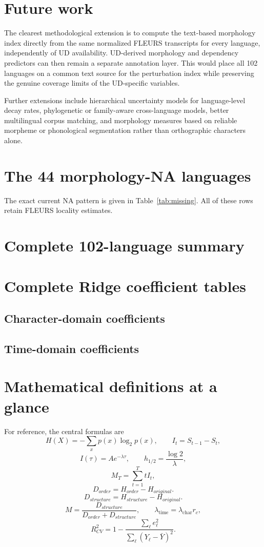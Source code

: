 \documentclass[11pt]{article}
\newcommand{\lch}{\lambda_{\mathrm{char}}}
\newcommand{\ltm}{\lambda_{\mathrm{time}}}
\begin{document}
\section{Future work}
The clearest methodological extension is to compute the text-based morphology index directly from the same normalized FLEURS transcripts for every language, independently of UD availability. UD-derived morphology and dependency predictors can then remain a separate annotation layer. This would place all 102 languages on a common text source for the perturbation index while preserving the genuine coverage limits of the UD-specific variables.

Further extensions include hierarchical uncertainty models for language-level decay rates, phylogenetic or family-aware cross-language models, better multilingual corpus matching, and morphology measures based on reliable morpheme or phonological segmentation rather than orthographic characters alone.

\appendix
\section{The 44 morphology-NA languages}
The exact current NA pattern is given in Table~\ref{tab:missing}. All of these rows retain FLEURS locality estimates.

\section{Complete 102-language summary}
\label{app:lang}
\small

\normalsize

\section{Complete Ridge coefficient tables}
\label{app:coeff}
\small
\subsection*{Character-domain coefficients}

\subsection*{Time-domain coefficients}

\normalsize

\section{Mathematical definitions at a glance}
For reference, the central formulas are
\[
H(X)=-\sum_xp(x)\log_2p(x),
\qquad
I_t=S_{t-1}-S_t,
\]
\[
I(\tau)=Ae^{-\lambda \tau},
\qquad
h_{1/2}=\frac{\log 2}{\lambda},
\]
\[
M_T=\sum_{t=1}^{T}tI_t,
\]
\[
D_{order}=H_{order}-H_{original}.
\]
\[
D_{structure}=H_{structure}-H_{original}.
\]
\[
M=\frac{D_{structure}}{D_{order}+D_{structure}},
\qquad
\ltm=\lch r_c,
\]
\[
R^2_{CV}=1-\frac{\sum_\ell e_\ell^2}{\sum_\ell(Y_\ell-\bar Y)^2}.
\]
\end{document}
